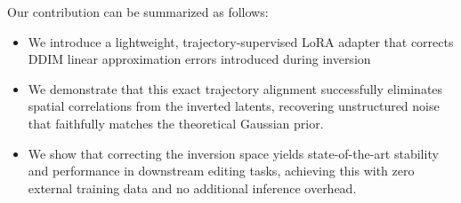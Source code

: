 \documentclass{article} %
\newcommand{\alek}[1]{{\color{purple}{alek: #1}}}
\begin{document}
Our contribution can be summarized as follows:

\begin{itemize}
    \item We introduce a lightweight, trajectory-supervised LoRA adapter that corrects DDIM linear approximation errors introduced during inversion
    \item We demonstrate that this exact trajectory alignment successfully eliminates spatial correlations from the inverted latents, recovering unstructured noise that faithfully matches the theoretical Gaussian prior.
   
    \item We show that correcting the inversion space yields state-of-the-art stability and performance in downstream editing tasks, achieving this with zero external training data and no additional inference overhead.
     \alek{This overstates the results a bit - we don't have full SOTA in downstream tasks}
\end{itemize}

\end{document}
